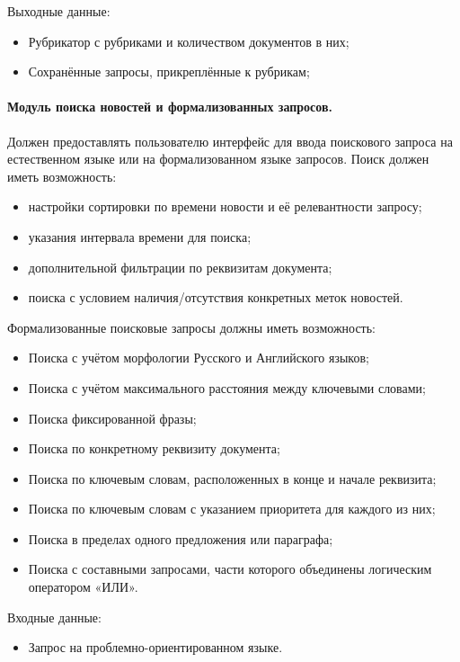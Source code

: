 Выходные данные:
\begin{itemize}
\item Рубрикатор с рубриками и количеством документов в них;
\item Сохранённые запросы, прикреплённые к рубрикам;
\end{itemize}

\paragraph{Модуль поиска новостей и формализованных запросов.}

Должен предоставлять пользователю интерфейс для ввода поискового запроса на
естественном языке или на формализованном языке запросов. Поиск должен
иметь возможность:
\begin{itemize}
\item настройки сортировки по времени новости и её релевантности запросу;
\item указания интервала времени для поиска;
\item дополнительной фильтрации по реквизитам документа;
\item поиска с условием наличия/отсутствия конкретных меток новостей.
\end{itemize}

Формализованные поисковые запросы должны иметь возможность:
\begin{itemize}
\item Поиска с учётом морфологии Русского и Английского языков;
\item Поиска с учётом максимального расстояния между ключевыми словами;
\item Поиска фиксированной фразы;
\item Поиска по конкретному реквизиту документа;
\item Поиска по ключевым словам, расположенных в конце и начале реквизита;
\item Поиска по ключевым словам с указанием приоритета для каждого из них;
\item Поиска в пределах одного предложения или параграфа;
\item Поиска с составными запросами, части которого объединены логическим оператором «ИЛИ».
\end{itemize}

Входные данные:
\begin{itemize}
\item Запрос на проблемно-ориентированном языке.
\end{itemize}

